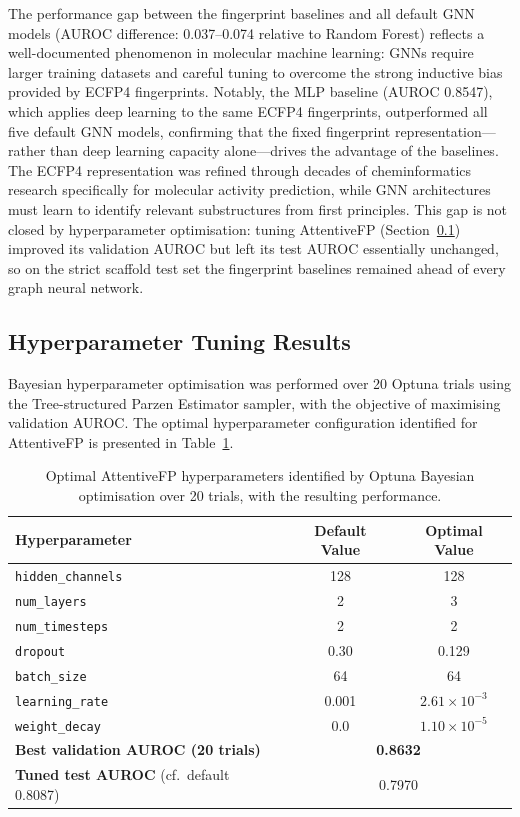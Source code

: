 The performance gap between the fingerprint baselines and all default GNN models
(AUROC difference: 0.037--0.074 relative to Random Forest) reflects a well-documented
phenomenon in molecular machine learning: GNNs require larger training datasets and
careful tuning to overcome the strong inductive bias provided by ECFP4 fingerprints.
Notably, the MLP baseline (AUROC 0.8547), which applies deep learning to the same
ECFP4 fingerprints, outperformed all five default GNN models, confirming that the
fixed fingerprint representation—rather than deep learning capacity alone—drives the
advantage of the baselines. The ECFP4 representation was refined through decades of
cheminformatics research specifically for molecular activity prediction, while GNN
architectures must learn to identify relevant substructures from first principles.
This gap is not closed by hyperparameter optimisation: tuning AttentiveFP
(Section~\ref{sec:hp_tuning}) improved its validation AUROC but left its test AUROC
essentially unchanged, so on the strict scaffold test set the fingerprint baselines
remained ahead of every graph neural network.

\subsection{Hyperparameter Tuning Results}
\label{sec:hp_tuning}

Bayesian hyperparameter optimisation was performed over 20 Optuna trials using the
Tree-structured Parzen Estimator sampler, with the objective of maximising
validation AUROC. The optimal hyperparameter configuration identified for
AttentiveFP is presented in Table~\ref{tab:optuna}.

\begin{table}[H]
\centering
\caption{Optimal AttentiveFP hyperparameters identified by Optuna Bayesian
         optimisation over 20 trials, with the resulting performance.}
\label{tab:optuna}
{\singlespacing
\begin{tabular}{lcc}
\toprule
\textbf{Hyperparameter} & \textbf{Default Value} & \textbf{Optimal Value} \\
\midrule
\texttt{hidden\_channels}  & 128   & 128                         \\
\texttt{num\_layers}       & 2     & 3                           \\
\texttt{num\_timesteps}    & 2     & 2                           \\
\texttt{dropout}           & 0.30  & 0.129                       \\
\texttt{batch\_size}       & 64    & 64                          \\
\texttt{learning\_rate}    & 0.001 & $2.61 \times 10^{-3}$       \\
\texttt{weight\_decay}     & 0.0   & $1.10 \times 10^{-5}$       \\
\midrule
\textbf{Best validation AUROC (20 trials)} & \multicolumn{2}{c}{\textbf{0.8632}} \\
\textbf{Tuned test AUROC} (cf.\ default 0.8087) & \multicolumn{2}{c}{0.7970} \\
\bottomrule
\end{tabular}
}
\end{table}

